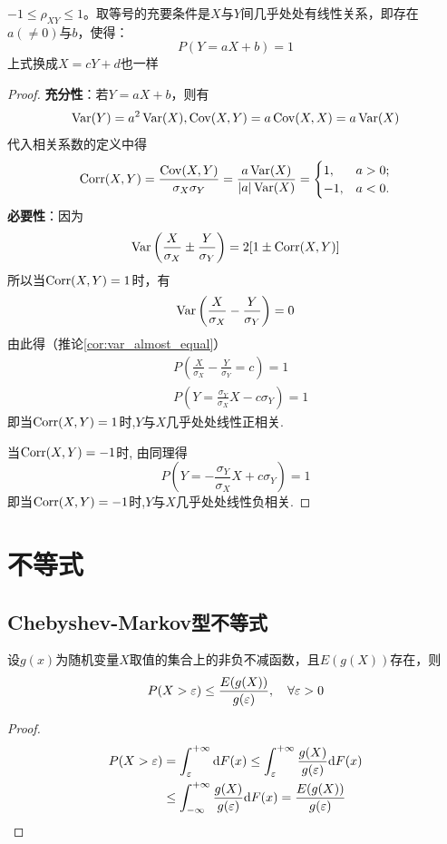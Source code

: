 \begin{proposition}
    $-1 \le \rho_{XY} \le 1$。取等号的充要条件是$X$与$Y$间几乎处处有线性关系，即存在$a(\ne0)$与$b$，使得：
    \[ P(Y=aX+b)=1 \]
    上式换成$X=cY+d$也一样
\end{proposition}
\begin{proof}
    \textbf{充分性}：若$Y=aX+b$，则有
    \[ \operatorname{Var}(Y)=a^2\operatorname{Var}(X),\operatorname{Cov}(X,Y)=a\operatorname{Cov}(X,X)=a\operatorname{Var}(X) \]
    代入相关系数的定义中得
    \[ \operatorname{Corr}(X,Y)=\frac{\operatorname{Cov}(X,Y)}{\sigma_{X}\sigma_{Y}}=\frac{a\operatorname{Var}(X)}{|a|\operatorname{Var}(X)}=\begin{cases}
            1,  & a>0; \\
            -1, & a<0.
        \end{cases} \]
    \textbf{必要性}：因为
    \[ \operatorname{Var}\left(\frac{X}{\sigma_{X}}\pm\frac{Y}{\sigma_{Y}} \right)=2[1\pm\operatorname{Corr}(X,Y)] \]
    所以当$\operatorname{Corr}(X,Y)=1$时，有
    \[ \operatorname{Var}\left(\frac{X}{\sigma_{X}}-\frac{Y}{\sigma_{Y}} \right)=0 \]
    由此得（推论\ref{cor:var_almost_equal}）
    \begin{align*}
         & P\left(\frac{X}{\sigma_{X}}-\frac{Y}{\sigma_{Y}}=c \right)=1  \\
         & P\left(Y=\frac{\sigma_{Y}}{\sigma_{X}}X-c\sigma_{Y} \right)=1
    \end{align*}
    即当$\operatorname{Corr}(X,Y)=1$时,$Y$与$X$几乎处处线性正相关.

    当$\operatorname{Corr}(X,Y)=-1$时, 由同理得
    \[ P\left(Y=-\frac{\sigma_{Y}}{\sigma_{X}}X+c\sigma_{Y} \right)=1 \]
    即当$\operatorname{Corr}(X,Y)=-1$时,$Y$与$X$几乎处处线性负相关.
\end{proof}

\section{不等式}

\subsection{Chebyshev-Markov型不等式}

\begin{theorem}[Markov不等式]\label{thm:Markov_inequality}
    设$g(x)$为随机变量$X$取值的集合上的非负不减函数，且$E(g(X))$存在，则
    \[ P(X>\varepsilon) \leq \frac{E(g(X))}{g(\varepsilon)} ,\quad \forall \varepsilon > 0\]
\end{theorem}
\begin{proof}
    \begin{align*}
        P(X>\varepsilon) & =\int_{\varepsilon}^{+\infty} \mathrm{d} F(x) \leq \int_{\varepsilon}^{+\infty}\frac{g(X)}{g(\varepsilon)}\mathrm{d} F(x) \\
                & \leq \int_{-\infty}^{+\infty}\frac{g(X)}{g(\varepsilon)}\mathrm{d} F(x) = \frac{E(g(X))}{g(\varepsilon)}
    \end{align*}
\end{proof}

